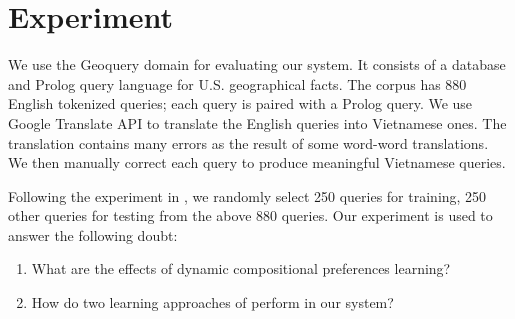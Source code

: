 \section{Experiment}
We use the Geoquery domain for evaluating our system. It consists of a database and Prolog query language for U.S. geographical facts. The corpus has 880 English tokenized queries; each query is paired with a Prolog query. We use Google Translate API to translate the English queries into Vietnamese ones. The translation contains many errors as the result of some word-word translations. We then manually correct each query to produce meaningful Vietnamese queries. 

Following the experiment in \cite{Clarke:2010:DSP:1870568.1870571}, we randomly select 250 queries for training, 250 other queries for testing from the above 880 queries. Our experiment is used to answer the following doubt:

\begin{enumerate}
  \item What are the effects of dynamic compositional preferences learning?
  \item How do two learning approaches of \cite{Clarke:2010:DSP:1870568.1870571} perform in our system?
\end{enumerate}

